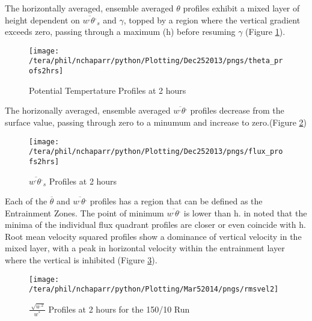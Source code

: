 The horizontally averaged, ensemble averaged $\theta$ profiles exhibit a mixed layer of height dependent on
$\overline{w^{,}\theta^{,}}_{s}$ and $\gamma$, topped by a region where the vertical gradient exceeds zero,
passing through a maximum (h) before resuming $\gamma$ (Figure \ref{fig:pottempprofs2hrs}).\\

\begin{figure}[!ht]
    \centering
    \texttt{[image: /tera/phil/nchaparr/python/Plotting/Dec252013/pngs/theta\_profs2hrs]}
    \caption{Potential Tempertature Profiles at 2 hours}
    \label{fig:pottempprofs2hrs}   %
\end{figure}


The horizonally averaged, ensemble averaged $\overline{w^{,}\theta^{,}}$ profiles decrease from the surface value, passing through zero to a minumum and increase to zero.(Figure \ref{fig:fluxprofs2hrs})\\

\begin{figure}[!ht]
    \centering
    \texttt{[image: /tera/phil/nchaparr/python/Plotting/Dec252013/pngs/flux\_profs2hrs]}
    \caption{$\overline{w^{,}\theta^{,}}_{s}$ Profiles at 2 hours}
    \label{fig:fluxprofs2hrs}   %
\end{figure}

Each of the $\overline{\theta}$ and $\overline{w^{,}\theta^{,}}$ profiles has a region that can be defined as the Entrainment Zones.  The point of minimum $\overline{w^{,}\theta^{,}}$
is lower than h.  \citeauthor{SullMoengStev} in \cite{SullMoengStev} noted that the minima of the individual flux quadrant profiles are closer or even coincide with h.\\

Root mean velocity squared profiles show a dominance of vertical velocity in the mixed layer, with a peak in horizontal velocity within the entrainment layer where the vertical is inhibited (Figure \ref{fig:rmsvel150102hrs}). \\

\begin{figure}[!ht]
    \centering
    \texttt{[image: /tera/phil/nchaparr/python/Plotting/Mar52014/pngs/rmsvel2]}
    \caption{$\frac{\sqrt[]{u^{,2}}}{w^{*}}$ Profiles at 2 hours for the 150/10 Run}
    \label{fig:rmsvel150102hrs}   %
\end{figure}

